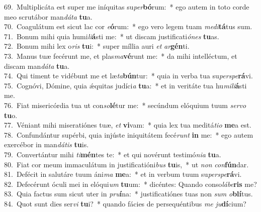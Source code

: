 {69.~}Multiplicáta est super me iníquitas su\textit{per}\textbf{bó}rum:~* ego autem in toto corde meo scrutábor man\textit{dá}\textit{ta} \textbf{tu}a.\\
{70.~}Coagulátum est sicut lac cor \textit{e}\textbf{ó}rum:~* ego vero legem tuam \textit{me}\textit{di}\textbf{tá}tus sum.\\
{71.~}Bonum mihi quia humi\textit{li}\textbf{á}sti me:~* ut discam justificati\textit{ó}\textit{nes} \textbf{tu}as.\\
{72.~}Bonum mihi lex o\textit{ris} \textbf{tu}i:~* super míllia auri \textit{et} \textit{ar}\textbf{gén}ti.\\
{73.~}Manus tuæ fecérunt me, et plas\textit{ma}\textbf{vé}runt me:~* da mihi intelléctum, et discam man\textit{dá}\textit{ta} \textbf{tu}a.\\
{74.~}Qui timent te vidébunt me et læ\textit{ta}\textbf{bún}tur:~* quia in verba tua su\textit{per}\textit{spe}\textbf{rá}vi.\\
{75.~}Cognóvi, Dómine, quia ǽquitas judíci\textit{a} \textbf{tu}a:~* et in veritáte tua hu\textit{mi}\textit{li}\textbf{á}sti me.\\
{76.~}Fiat misericórdia tua ut con\textit{so}\textbf{lé}tur me:~* secúndum elóquium tuum \textit{ser}\textit{vo} \textbf{tu}o.\\
{77.~}Véniant mihi miseratiónes tuæ, \textit{et} \textbf{vi}vam:~* quia lex tua meditá\textit{ti}\textit{o} \textbf{me}a est.\\
{78.~}Confundántur supérbi, quia injúste iniquitátem fecé\textit{runt} \textbf{in} me:~* ego autem exercébor in man\textit{dá}\textit{tis} \textbf{tu}is.\\
{79.~}Convertántur mihi \textit{ti}\textbf{mén}tes te:~* et qui novérunt testimó\textit{ni}\textit{a} \textbf{tu}a.\\
{80.~}Fiat cor meum immaculátum in justificatióni\textit{bus} \textbf{tu}is,~* ut \textit{non} \textit{con}\textbf{fún}dar.\\
{81.~}Defécit in salutáre tuum áni\textit{ma} \textbf{me}a:~* et in verbum tuum su\textit{per}\textit{spe}\textbf{rá}vi.\\
{82.~}Defecérunt óculi mei in elóqui\textit{um} \textbf{tu}um:~* dicéntes: Quando conso\textit{lá}\textit{be}\textbf{ris} me?\\
{83.~}Quia factus sum sicut uter in \textit{pru}\textbf{í}na:~* justificatiónes tuas non \textit{sum} \textit{o}\textbf{blí}tus.\\
{84.~}Quot sunt dies ser\textit{vi} \textbf{tu}i?~* quando fácies de persequéntibus \textit{me} \textit{ju}\textbf{dí}cium?\\
